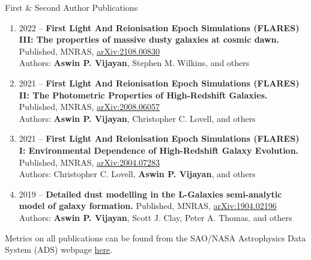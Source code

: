\documentclass[a4paper,10pt]{resume} %
\begin{document}
\begin{rSection}{First \& Second Author Publications}
\begin{enumerate}
    \item {2022 -- \bf First Light And Reionisation Epoch Simulations	(FLARES) III: The properties of massive dusty galaxies at cosmic dawn.} Published, MNRAS, \href{https://arxiv.org/abs/2108.00830}{\color{blue} arXiv:2108.00830}\\
    Authors: \textbf{Aswin P. Vijayan}, Stephen M. Wilkins, and others
    \item {2021 -- \bf First Light And Reionisation Epoch Simulations (FLARES) II: The Photometric Properties of High-Redshift Galaxies.} Published, MNRAS, \href{https://arxiv.org/abs/2008.06057}{\color{blue}arXiv:2008.06057}\\
    Authors: \textbf{Aswin P. Vijayan}, Christopher C. Lovell, and others
    \item {2021 -- \bf First Light And Reionisation Epoch Simulations (FLARES) I: Environmental Dependence of High-Redshift Galaxy Evolution.} Published, MNRAS, \href{https://ui.adsabs.harvard.edu/abs/2020MNRAS.tmp.3168L/abstract}{\color{blue}arXiv:2004.07283}\\
    Authors: Christopher C. Lovell, \textbf{Aswin P. Vijayan}, and others
    \item {2019 -- \bf Detailed dust modelling in the L-Galaxies semi-analytic model of galaxy formation.} Published, MNRAS, \href{https://ui.adsabs.harvard.edu/abs/2019MNRAS.489.4072V/abstract}{\color{blue}arXiv:1904.02196}\\
    Authors: \textbf{Aswin P. Vijayan}, Scott J. Clay, Peter A. Thomas, and others
\end{enumerate}
Metrics on all publications can be found from the SAO/NASA Astrophysics Data System (ADS) webpage 
\href{https://ui.adsabs.harvard.edu/public-libraries/nx11cjS2ROuxirheKfVAYw}{\color{blue}here}.
\end{rSection} 
\end{document}
